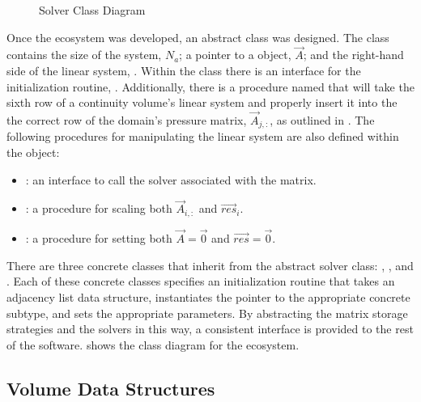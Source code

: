 \begin{figure}[ht!]
\singlespace\centering

\caption{Solver Class Diagram}
\label{fig:solverClassDiagram}
\end{figure}

Once the  ecosystem was developed, an abstract  class was designed.
The  class contains the size of the system, $N_{a}$; a pointer to a  object, $\vec{A}$; and the right-hand side of the linear system, .
Within the  class there is an interface for the initialization routine, .
Additionally, there is a procedure named  that will take the sixth row of a continuity volume's linear system and properly insert it into the the correct row of the domain's pressure matrix, $\vec{A}_{j,:}$, as outlined in .
The following procedures for manipulating the linear system are also defined within the  object:

\begin{itemize}
\item{  : an interface to call the solver associated with the matrix.}
\item{  : a procedure for scaling both $\vec{A}_{i, :}$ and $\vec{res}_{i}$.}
\item{  : a procedure for setting both $\vec{A} = \vec{0}$ and $\vec{res} = \vec{0}$.}
\end{itemize}

There are three concrete classes that inherit from the abstract solver class: , , and .
Each of these concrete classes specifies an initialization routine that takes an adjacency list data structure, instantiates the  pointer to the appropriate concrete subtype, and sets the appropriate parameters.
By abstracting the matrix storage strategies and the solvers in this way, a consistent interface is provided to the rest of the software.
 shows the class diagram for the  ecosystem.

\subsection{Volume Data Structures}
\label{subsect:domDecompVolumeStructs}

